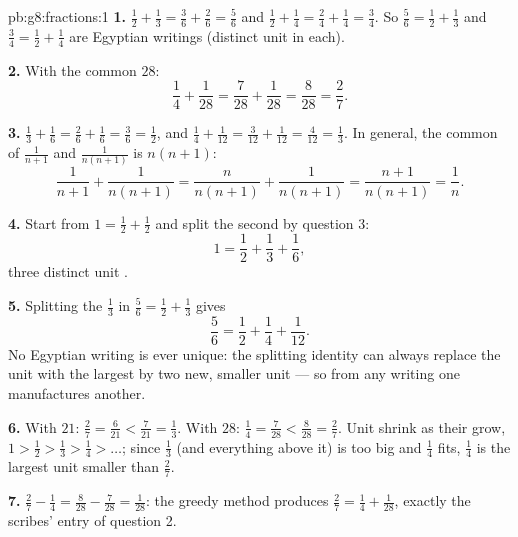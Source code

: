 \begin{solution}{pb:g8:fractions:1}
\textbf{1.} $\frac12 + \frac13 = \frac36 + \frac26 = \frac56$ and
$\frac12 + \frac14 = \frac24 + \frac14 = \frac34$. So
$\frac56 = \frac12 + \frac13$ and $\frac34 = \frac12 + \frac14$
are Egyptian writings (distinct unit  in each).

\textbf{2.} With the common  $28$:
\[
\frac14 + \frac{1}{28} = \frac{7}{28} + \frac{1}{28}
= \frac{8}{28} = \frac{2}{7} .
\]

\textbf{3.} $\frac13 + \frac16 = \frac26 + \frac16 = \frac36 =
\frac12$, and $\frac14 + \frac{1}{12} = \frac{3}{12} +
\frac{1}{12} = \frac{4}{12} = \frac13$. In general, the common
 of $\frac{1}{n+1}$ and $\frac{1}{n(n+1)}$ is
$n(n+1)$:
\[
\frac{1}{n+1} + \frac{1}{n(n+1)}
= \frac{n}{n(n+1)} + \frac{1}{n(n+1)}
= \frac{n+1}{n(n+1)}
= \frac{1}{n} .
\]

\textbf{4.} Start from $1 = \frac12 + \frac12$ and split the
second  by question 3:
\[
1 = \frac12 + \frac13 + \frac16 ,
\]
three distinct unit .

\textbf{5.} Splitting the $\frac13$ in $\frac56 = \frac12 +
\frac13$ gives
\[
\frac56 = \frac12 + \frac14 + \frac{1}{12} .
\]
No Egyptian writing is ever unique: the splitting identity can
always replace the unit  with the largest  by
two new,  smaller unit  --- so from any writing one
manufactures another.

\textbf{6.} With  $21$: $\frac27 = \frac{6}{21} <
\frac{7}{21} = \frac13$. With  $28$: $\frac14 =
\frac{7}{28} < \frac{8}{28} = \frac27$. Unit  shrink as
their  grow, $1 > \frac12 > \frac13 > \frac14 >
\dots$; since $\frac13$ (and everything above it) is too big and
$\frac14$ fits, $\frac14$ is the largest unit  smaller
than $\frac27$.

\textbf{7.} $\frac27 - \frac14 = \frac{8}{28} - \frac{7}{28} =
\frac{1}{28}$: the greedy method produces
$\frac27 = \frac14 + \frac{1}{28}$, exactly the scribes' entry of
question 2.


\end{solution}
